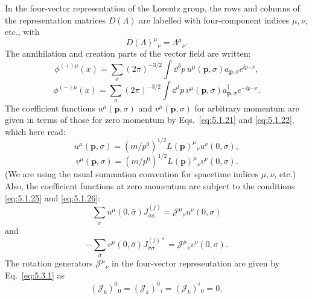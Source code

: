 In the four-vector representation of the Lorentz group, the rows and columns
of the representation matrices $D(\Lambda)$ are labelled with four-component
indices $\mu,\nu$, etc., with
\begin{equation}
  D(\Lambda)^\mu{}_{\nu}=\Lambda^\mu{}_{\nu}.
  \tag{5.3.1}\label{eq:5.3.1}
\end{equation}
The annihilation and creation parts of the vector field are written:
\begin{equation}
  \phi^{(+)\mu}(x)=\sum_\sigma(2\pi)^{-3/2}\int \dd^3p\,
  u^\mu(\mathbf{p},\sigma)a_{\mathbf{p},\sigma}e^{\ii p\cdot x},
  \tag{5.3.2}\label{eq:5.3.2}
\end{equation}
\begin{equation}
  \phi^{(-)\mu}(x)=\sum_\sigma(2\pi)^{-3/2}\int \dd^3p\,
  v^\mu(\mathbf{p},\sigma)a^\dagger_{\mathbf{p},\sigma}e^{-\ii p\cdot x}.
  \tag{5.3.3}\label{eq:5.3.3}
\end{equation}
The coefficient functions $u^\mu(\mathbf{p},\sigma)$ and
$v^\mu(\mathbf{p},\sigma)$ for arbitrary momentum are given in terms of those
for zero momentum by Eqs.~\eqref{eq:5.1.21} and \eqref{eq:5.1.22}, which here read:
\begin{equation}
  u^\mu(\mathbf{p},\sigma)=(m/p^0)^{1/2}
  L(\mathbf{p})^\mu{}_{\nu}u^\nu(0,\sigma),
  \tag{5.3.4}\label{eq:5.3.4}
\end{equation}
\begin{equation}
  v^\mu(\mathbf{p},\sigma)=(m/p^0)^{1/2}
  L(\mathbf{p})^\mu{}_{\nu}v^\nu(0,\sigma).
  \tag{5.3.5}\label{eq:5.3.5}
\end{equation}
(We are using the usual summation convention for spacetime indices
$\mu,\nu$, etc.) Also, the coefficient functions at zero momentum are subject
to the conditions \eqref{eq:5.1.25} and \eqref{eq:5.1.26}:
\begin{equation}
  \sum_{\bar\sigma}u^\mu(0,\bar\sigma)J^{(j)}_{\bar\sigma\sigma}
  =\mathcal{J}^\mu{}_{\nu}u^\nu(0,\sigma)
  \tag{5.3.6}\label{eq:5.3.6}
\end{equation}
and
\begin{equation}
  -\sum_{\bar\sigma}v^\mu(0,\bar\sigma)J^{(j)*}_{\bar\sigma\sigma}
  =\mathcal{J}^\mu{}_{\nu}v^\nu(0,\sigma).
  \tag{5.3.7}\label{eq:5.3.7}
\end{equation}
The rotation generators $\boldsymbol{\mathcal{J}}^\mu{}_{\nu}$ in the
four-vector representation are given by Eq.~\eqref{eq:5.3.1} as
\begin{equation}
  (\mathcal{J}_k)^0{}_0=(\mathcal{J}_k)^0{}_i
  =(\mathcal{J}_k)^i{}_0=0,
  \tag{5.3.8}\label{eq:5.3.8}
\end{equation}
